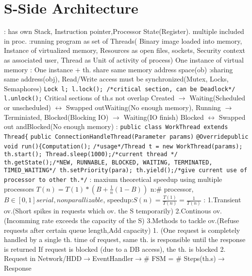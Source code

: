 \section{S-Side Architecture}
: has own Stack, Instruction pointer,Processor State(Register). multiple included in proc.
\textbar
{}:running program as set of Threads(
Binary image loaded into memory,
Instance of virtualized memory,
Resources as open files, sockets,
Security context as associated user,
Thread as Unit of activity of process)
\textbar
{} One instance of virtual memory
\textbar
{}: One instance + th. share same memory address space(ob)
\textbar
{}:sharing same address(obj), Read/Write access must be synchronized(Mutex, Locks, Semaphores)
\lstinline{Lock l; l.lock(); /*critical section, can be Deadlock*/ l.unlock();}
Critical sections of th.s not overlap
\textbar
{} Created $\rightarrow$ Waiting(Scheduled or unscheduled) $\leftrightarrow$
Swapped outWaiting(No enough memory), Running $\rightarrow$ Terminiated, Blocked(Blocking IO)
$\rightarrow$ Waiting(IO finish) Blocked $\leftrightarrow$ Swapped out andBlocked(No enough memory)
\textbar
{}: 
\lstinline{public class WorkThread extends Thread{}
\lstinline{public ConnectionHandleThread(Parameter params)}
\lstinline{@Overridepublic void run(){Computation();}
\lstinline{/*usage*/Thread t = new WorkThread(params); th.start(); Thread.sleep(1000);/*current thread */ th.getState();/*NEW, RUNNABLE, BLOCKED, WAITING, TERMINATED, TIMED_WAITING*/ th.setPriority(para); th.yield();/*give current use of processor to other th.*/}
\textbar
{}: maxium theoretical speedup using multiple processors
$T(n)=T(1)*(B+\frac{1}{n}(1-B))$ n:\# processor, $B\in[0,1] serial,nonparallizable$,
speedup:$S(n)=\frac{T(1)}{T(n)}=\frac{1}{T(n)}$
\textbar
{}:
1.Transient ov.(Short spikes in requests which ov. the S temporarily)
2.Continous ov.(Incomming rate exceeds the capacity of the S)
3.Methods to tackle ov.(Refuse requests after certain queue length,Add capacity)
\textbar
{}
1.
(One request is completely handled by a single th.
time of request, same th. is responsible until the response is returned
If request is blocked (due to a DB access), the th. is blocked
2.
Request in Network/HDD$\rightarrow$EventHandler$\rightarrow$\# FSM = \# Steps(th.s)$\rightarrow$Response
